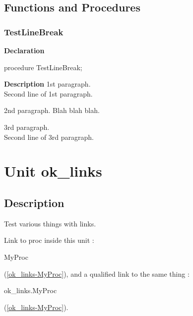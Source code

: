 \documentclass{report}
\newif\ifpdf
\begin{document}
\section{Functions and Procedures}
\ifpdf
\subsection*{\large{\textbf{TestLineBreak}}\normalsize\hspace{1ex}\hrulefill}
\else
\subsection*{TestLineBreak}
\fi
\label{ok_line_break-TestLineBreak}
\begin{list}{}{
\setlength{\itemindent}{0cm}
\setlength{\listparindent}{0cm}
\setlength{\leftmargin}{\evensidemargin}
\addtolength{\leftmargin}{\tmplength}
\settowidth{\labelsep}{X}
\addtolength{\leftmargin}{\labelsep}
\setlength{\labelwidth}{\tmplength}
}
\item[\textbf{Declaration}\hfill]
\ifpdf
\begin{flushleft}
\fi
\begin{ttfamily}
procedure TestLineBreak;\end{ttfamily}

\ifpdf
\end{flushleft}
\fi

\par
\item[\textbf{Description}]
1st paragraph. \\{} Second line of 1st paragraph.

2nd paragraph. Blah blah blah.

3rd paragraph. \\{} Second line of 3rd paragraph.

\end{list}
\chapter{Unit ok{\_}links}
\label{ok_links}
\section{Description}
Test various things with links.\hfill\vspace*{1ex}



Link to proc inside this unit : \begin{ttfamily}MyProc\end{ttfamily}(\ref{ok_links-MyProc}), and a qualified link to the same thing : \begin{ttfamily}ok{\_}links.MyProc\end{ttfamily}(\ref{ok_links-MyProc}).
\end{document}
